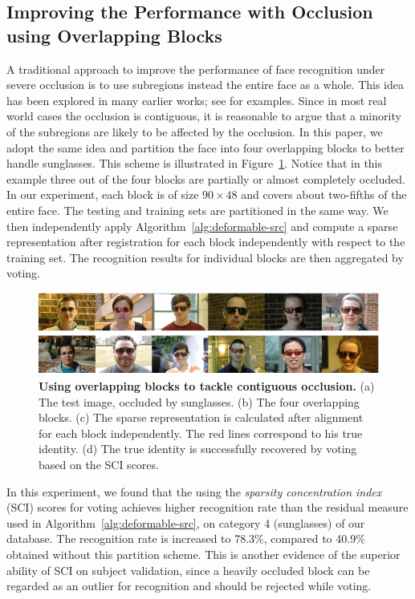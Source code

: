 \documentclass[10pt,journal,letterpaper,compsoc]{IEEEtran}
\begin{document}
\subsection{Improving the Performance with Occlusion using Overlapping Blocks}
A traditional approach to improve the performance of face
recognition under severe occlusion is to use subregions instead
the entire face as a whole. This idea has been explored in many
earlier works; see \cite{Pentland1994-CVPR, Wright2009-PAMI}
for examples. Since in most real world cases the occlusion is contiguous, it is reasonable to argue that a minority of the
subregions are likely to be affected by the occlusion. In this
paper, we adopt the same idea and partition the face into four
overlapping blocks to better handle sunglasses. This
scheme is illustrated in Figure~\ref{fig:occ-block}. Notice
that in this example three out of the four blocks are partially
or almost completely occluded. In our experiment, each block is
of size $90\times 48$ and covers about two-fifths of the entire
face. The testing and training sets are partitioned in the same
way. We then independently apply
Algorithm~\ref{alg:deformable-src} and compute a sparse
representation after registration for each block independently
with respect to the training set. The recognition
results for individual blocks are then aggregated by voting.

\begin{figure}
\centering
\includegraphics{Figure_14}
\vspace{-2mm}
\caption{{\bf Using overlapping blocks to tackle contiguous occlusion.} (a) The test image, occluded by sunglasses. (b) The four overlapping blocks. (c) The sparse representation is calculated after alignment for each block independently. The red lines correspond to his true identity. (d) The true identity is successfully recovered by voting based on the SCI scores.}
\label{fig:occ-block}
\vspace{-5mm}
\end{figure}

In this experiment, we found that the using the \emph{sparsity
concentration index} (SCI) scores for voting achieves higher
recognition rate than the residual measure used in Algorithm~\ref{alg:deformable-src}, on
category 4 (sunglasses) of our database. The recognition rate
is increased to 78.3\%, compared to 40.9\% obtained without
this partition scheme. This is another evidence of the superior
ability of SCI on subject validation, since a heavily occluded
block can be regarded as an outlier for recognition and should
be rejected while voting.
\end{document}

